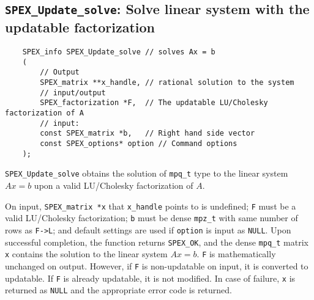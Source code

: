 \documentclass[12pt,oneside]{book}
\theoremstyle{definition}
\begin{document}
{%
\subsection{\texttt{SPEX\_Update\_solve}: Solve linear system with the updatable factorization}\label{ss:SPEX_Update_solve}
\begin{mdframed}[userdefinedwidth=\textwidth]
{\footnotesize
\begin{verbatim}
    SPEX_info SPEX_Update_solve // solves Ax = b
    (
        // Output
        SPEX_matrix **x_handle, // rational solution to the system
        // input/output
        SPEX_factorization *F,  // The updatable LU/Cholesky factorization of A
        // input:
        const SPEX_matrix *b,   // Right hand side vector
        const SPEX_options* option // Command options
    );
\end{verbatim}
} \end{mdframed}

\verb|SPEX_Update_solve| obtains the solution of \verb|mpq_t| type to the
linear system $Ax=b$ upon a valid LU/Cholesky factorization of $A$.

On input, \verb|SPEX_matrix *x| that \verb|x_handle| points to is undefined; \verb|F| must be a valid LU/Cholesky factorization; \verb|b| must be dense \verb|mpz_t| with same number of rows as \verb|F->L|; and default settings are used if
\verb|option| is input as \verb|NULL|. Upon successful completion, the function returns \verb|SPEX_OK|, and the dense \verb|mpq_t| matrix \verb|x|
contains the solution  to the linear
system $Ax=b$. \verb|F| is mathematically unchanged on output. However, if \verb|F| is non-updatable on input, it is converted to updatable. If \verb|F| is already updatable, it is not modified.
In case of failure, \verb|x| is returned as \verb|NULL| and the appropriate error code is returned.


}
\end{document}
